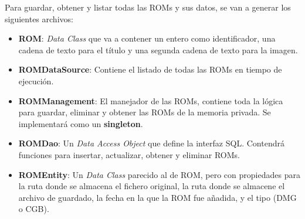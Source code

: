 Para guardar, obtener y listar todas las ROMs y sus datos, se van a generar los siguientes archivos:
\begin{itemize}
    \item \textbf{ROM}: \textit{Data Class} que va a contener un entero como identificador, una cadena de texto para el título y una segunda cadena de texto para la imagen.
    \item \textbf{ROMDataSource}: Contiene el listado de todas las ROMs en tiempo de ejecución.
    \item \textbf{ROMManagement}: El manejador de las ROMs, contiene toda la lógica para guardar, eliminar y obtener las ROMs de la memoria privada. Se implementará como un \textbf{singleton}.
    \item \textbf{ROMDao}: Un \textit{Data Access Object} que define la interfaz SQL. Contendrá funciones para insertar, actualizar, obtener y eliminar ROMs.
    \item \textbf{ROMEntity}: Un \textit{Data Class} parecido al de ROM, pero con propiedades para la ruta donde se almacena el fichero original, la ruta donde se almacene el archivo de guardado, la fecha en la que la ROM fue añadida, y el tipo (DMG o CGB).
\end{itemize}

